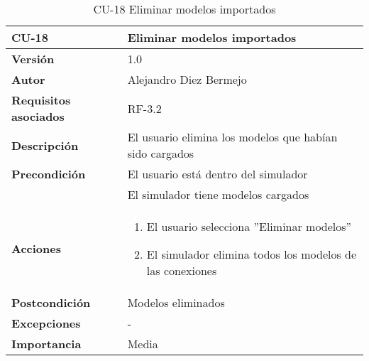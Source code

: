 \begin{table}[p]
	\centering
	\begin{tabularx}{\linewidth}{ p{} p{} }
		\toprule
		\textbf{CU-18}    & \textbf{Eliminar modelos importados}\\
		\toprule
		\textbf{Versión}              & 1.0    \\
		\textbf{Autor}                & Alejandro Diez Bermejo \\
		\textbf{Requisitos asociados} & RF-3.2 \\
		\textbf{Descripción}          & El usuario elimina los modelos que habían sido cargados \\
        \textbf{Precondición}         & El usuario está dentro del simulador \\
                                      & El simulador tiene modelos cargados \\
		\textbf{Acciones}             &
		\begin{enumerate}
			\def\labelenumi{\arabic{enumi}.}
			\tightlist
			\item El usuario selecciona ”Eliminar modelos”
            \item El simulador elimina todos los modelos de las conexiones
		\end{enumerate}\\
		\textbf{Postcondición}        & Modelos eliminados \\
		\textbf{Excepciones}          & - \\
		\textbf{Importancia}          & Media \\
		\bottomrule
	\end{tabularx}
	\caption{CU-18 Eliminar modelos importados}
\end{table}

